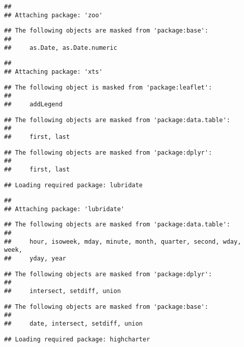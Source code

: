 \documentclass[
]{article}
\begin{document}
\begin{verbatim}
## 
## Attaching package: 'zoo'
\end{verbatim}

\begin{verbatim}
## The following objects are masked from 'package:base':
## 
##     as.Date, as.Date.numeric
\end{verbatim}

\begin{verbatim}
## 
## Attaching package: 'xts'
\end{verbatim}

\begin{verbatim}
## The following object is masked from 'package:leaflet':
## 
##     addLegend
\end{verbatim}

\begin{verbatim}
## The following objects are masked from 'package:data.table':
## 
##     first, last
\end{verbatim}

\begin{verbatim}
## The following objects are masked from 'package:dplyr':
## 
##     first, last
\end{verbatim}

\begin{verbatim}
## Loading required package: lubridate
\end{verbatim}

\begin{verbatim}
## 
## Attaching package: 'lubridate'
\end{verbatim}

\begin{verbatim}
## The following objects are masked from 'package:data.table':
## 
##     hour, isoweek, mday, minute, month, quarter, second, wday, week,
##     yday, year
\end{verbatim}

\begin{verbatim}
## The following objects are masked from 'package:dplyr':
## 
##     intersect, setdiff, union
\end{verbatim}

\begin{verbatim}
## The following objects are masked from 'package:base':
## 
##     date, intersect, setdiff, union
\end{verbatim}

\begin{verbatim}
## Loading required package: highcharter
\end{verbatim}
\end{document}
